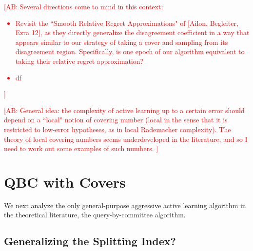 \documentclass{article}[12pt]
\newcommand{\authcmt}[2]{\ifnum\Comments=1\textcolor{#1}{#2}\fi}
\newcommand{\akshay}[1]{\authcmt{red}      {[AB: #1]}}
\theoremstyle{named}
\begin{document}
\akshay{Several directions come to mind in this context: 
\begin{itemize}
\item
Revisit the ``Smooth Relative Regret Approximations" of [Ailon, Begleiter, Ezra 12], 
as they directly generalize the disagreement coefficient in a way that appears similar 
to our strategy of taking a cover and sampling from its disagreement region. 
Specifically, is one epoch of our algorithm equivalent to taking their relative regret approximation?
\item
df
\end{itemize}}

\akshay{General idea: the complexity of active learning up to a certain error should depend on 
a ``local" notion of covering number 
(local in the sense that it is restricted to low-error hypotheses, as in local Rademacher complexity). 
The theory of local covering numbers seems underdeveloped in the literature, 
and so I need to work out some examples of such numbers. }





\newpage
\section{QBC with Covers}
We next analyze the only general-purpose aggressive active learning algorithm in the theoretical literature, 
the query-by-committee algorithm. 


\subsection{Generalizing the Splitting Index?}
\end{document}
